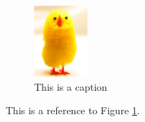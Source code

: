 \documentclass{report}
\begin{document}
    
    \begin{figure}

        \begin{center}
            \includegraphics[height=100px]{chick_pic.png}
            \caption{This is a caption}
            \label{fig:chick}
        \end{center}
    
    \end{figure}


This is a reference to Figure \ref{fig:chick}.
\end{document}

